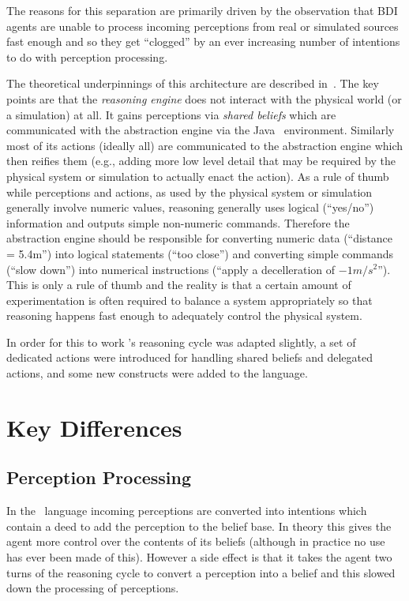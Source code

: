 \documentclass[a4]{article}
\begin{document}
The reasons for this separation are primarily driven by the observation that BDI agents are unable to process incoming perceptions from real or simulated sources fast enough and so they get ``clogged'' by an ever increasing number of intentions to do with perception processing.  

The theoretical underpinnings of this architecture are described in~\cite{DALT10:abstraction}.  The key points are that the \emph{reasoning engine} does not interact with the physical world (or a simulation) at all.  It gains perceptions via \emph{shared beliefs} which are communicated with the abstraction engine via the Java \eass\ environment.  Similarly most of its actions (ideally all) are communicated to the abstraction engine which then reifies them (e.g., adding more low level detail that may be required by the physical system or simulation to actually enact the action).  As a rule of thumb while perceptions and actions, as used by the physical system or simulation generally involve numeric values, reasoning generally uses logical (``yes/no'') information and outputs simple non-numeric commands.  Therefore the abstraction engine should be responsible for converting numeric data (``distance = 5.4m'') into logical statements (``too close'') and converting simple commands (``slow down'') into numerical instructions (``apply a decelleration of $-1m/s^2$'').  This is only a rule of thumb and the reality is that a certain amount of experimentation is often required to balance a system appropriately so that reasoning happens fast enough to adequately control the physical system.

In order for this to work \gwendolen's reasoning cycle was adapted slightly, a set of dedicated actions were introduced for handling shared beliefs and delegated actions, and some new constructs were added to the language.

\section{Key Differences}
\subsection{Perception Processing}
In the \gwendolen\ language incoming perceptions are converted into intentions which contain a deed to add the perception to the belief base.  In theory this gives the agent more control over the contents of its beliefs (although in practice no use has ever been made of this).  However a side effect is that it takes the agent two turns of the reasoning cycle to convert a perception into a belief and this slowed down the processing of perceptions.
\end{document}
